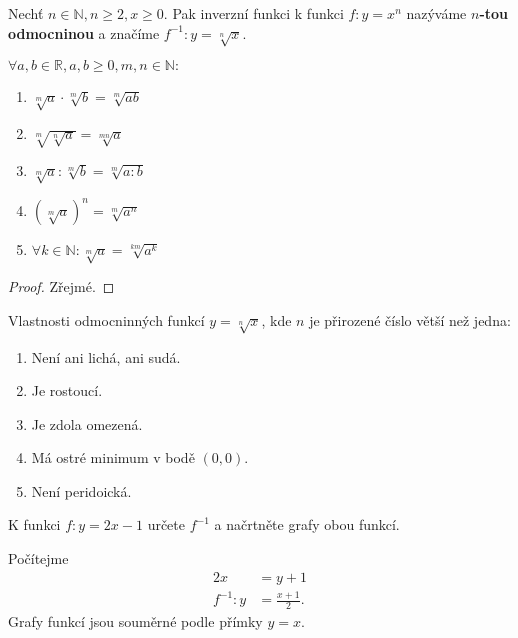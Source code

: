 \begin{definition}
    Nechť $n\in \mathbb N, n\geq 2, x \geq 0.$ Pak inverzní funkci k funkci
    $f:y=x^n$ nazýváme \textbf{$n$-tou odmocninou} a značíme $f^{-1}: y=\sqrt[n]{x}.$
\end{definition}

\begin{veta}
    $\forall a,b \in \mathbb R, a,b \geq 0, m,n \in \mathbb N:$
    \begin{enumerate}[$i.$]
        \item $\sqrt[m]{a}\cdot \sqrt[m]{b}=\sqrt[m]{ab}$
       	\item $\sqrt[m]{\sqrt[n]{a} } = \sqrt[mn]{a}$
       	\item $\sqrt[m]{a} : \sqrt[m]{b} = \sqrt[m]{a:b}$
       	\item $\left ( \sqrt[m]{a}  \right )^n = \sqrt[m]{a^n}  $
       	\item $\forall k \in \mathbb N: \sqrt[m]{a}=\sqrt[km]{a^k}$
    \end{enumerate}
\end{veta}

\begin{proof}
    Zřejmé.
\end{proof}

\begin{veta}
    Vlastnosti odmocninných funkcí $y= \sqrt[n]{x}$, kde $n$ je přirozené číslo větší
    než jedna:
    \begin{enumerate}[$i.$]
        \item Není ani lichá, ani sudá.
       	\item Je rostoucí.
        \item Je zdola omezená.
        \item Má ostré minimum v bodě $(0,0).$
        \item Není peridoická.
    \end{enumerate}
\end{veta}

\begin{priklad}
K funkci $f:y=2x-1$ určete $f^{-1}$ a načrtněte grafy obou funkcí.
\end{priklad}

\begin{reseni}
Počítejme
\begin{align*}
    2x&=y+1\\
    f^{-1}:y &= \frac{x+1}{2}.
\end{align*}
Grafy funkcí jsou souměrné podle přímky $y=x.$
\end{reseni}
